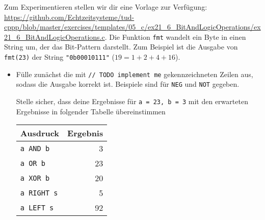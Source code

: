 Zum Experimentieren stellen wir dir eine Vorlage zur Verfügung: \url{https://github.com/Echtzeitsysteme/tud-cppp/blob/master/exercises/templates/05_c/ex21_6_BitAndLogicOperations/ex21_6_BitAndLogicOperations.c}.
Die Funktion \lstinline|fmt| wandelt ein Byte in einen String um, der das Bit-Pattern darstellt.
Zum Beispiel ist die Ausgabe von \lstinline|fmt(23)| der String \lstinline|"0b00010111"| ($19 = 1 + 2 + 4 + 16$).
\begin{itemize}
\item 
Fülle zunächst die mit \lstinline|// TODO implement me| gekennzeichneten Zeilen aus, sodass die Ausgabe korrekt ist.
Beispiele sind für \texttt{NEG} und \texttt{NOT} gegeben.

Stelle sicher, dass deine Ergebnisse für \lstinline|a = 23, b = 3| mit den erwarteten Ergebnisse in folgender Tabelle übereinstimmen\\[1ex]
\begin{center}
\begin{tabular}{lr}
\toprule
\textbf{Ausdruck} & \textbf{Ergebnis}\\
\midrule
\texttt{a AND b} & 3\\
\texttt{a OR b} & 23\\
\texttt{a XOR b} & 20\\
\midrule
\texttt{a RIGHT s} & 5\\
\texttt{a LEFT s} & 92\\
\bottomrule
\end{tabular}
\end{center}


\end{itemize}
